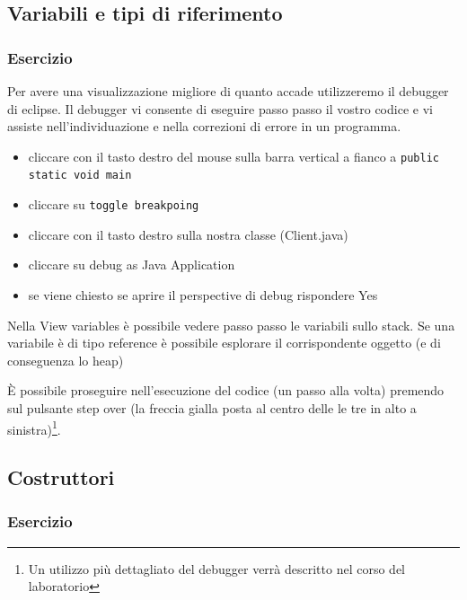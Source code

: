\documentclass{article}
\theoremstyle{definition}
\begin{document}





\subsection{Variabili e tipi di riferimento}

\subsubsection{Esercizio}



Per avere una visualizzazione migliore di quanto accade utilizzeremo il debugger di eclipse. Il debugger vi consente di eseguire passo passo il vostro codice e vi assiste nell'individuazione e nella correzioni di errore in un programma.

\begin{itemize}
\item cliccare con il tasto destro del mouse sulla barra vertical a fianco a \texttt{public static void main}
\item cliccare su \texttt{toggle breakpoing}
\item cliccare con il tasto destro sulla nostra classe (Client.java)
\item cliccare su debug as Java Application
\item se viene chiesto se aprire il perspective di debug rispondere Yes
\end{itemize}
Nella View variables \`e possibile vedere passo passo le variabili sullo stack. Se una variabile \`e di tipo reference \`e possibile esplorare il corrispondente oggetto (e di conseguenza lo heap)

\`E possibile proseguire nell'esecuzione del codice (un passo alla volta) premendo sul pulsante step over (la freccia gialla posta al centro delle le tre in alto a sinistra)\footnote{Un utilizzo pi\`u dettagliato del debugger verr\`a descritto nel corso del laboratorio}.



\subsection{Costruttori}
\subsubsection{Esercizio}
\end{document}
